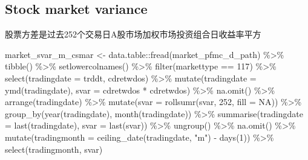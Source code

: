 \documentclass[
]{article}
\newenvironment{Shaded}{\begin{snugshade}}{\end{snugshade}}
\newcommand{\AttributeTok}[1]{\textcolor[rgb]{0.77,0.63,0.00}{#1}}
\newcommand{\ConstantTok}[1]{\textcolor[rgb]{0.00,0.00,0.00}{#1}}
\newcommand{\DecValTok}[1]{\textcolor[rgb]{0.00,0.00,0.81}{#1}}
\newcommand{\FunctionTok}[1]{\textcolor[rgb]{0.00,0.00,0.00}{#1}}
\newcommand{\NormalTok}[1]{#1}
\newcommand{\OtherTok}[1]{\textcolor[rgb]{0.56,0.35,0.01}{#1}}
\newcommand{\SpecialCharTok}[1]{\textcolor[rgb]{0.00,0.00,0.00}{#1}}
\newcommand{\StringTok}[1]{\textcolor[rgb]{0.31,0.60,0.02}{#1}}
\begin{document}
\hypertarget{stock-market-variance}{%
\subsection{Stock market variance}\label{stock-market-variance}}

股票方差是过去252个交易日A股市场加权市场投资组合日收益率平方

\begin{Shaded}
\begin{Highlighting}[]
\NormalTok{market\_svar\_m\_csmar }\OtherTok{\textless{}{-}}\NormalTok{ data.table}\SpecialCharTok{::}\FunctionTok{fread}\NormalTok{(market\_pfmc\_d\_path) }\SpecialCharTok{\%\textgreater{}\%} 
  \FunctionTok{tibble}\NormalTok{() }\SpecialCharTok{\%\textgreater{}\%} 
  \FunctionTok{setlowercolnames}\NormalTok{() }\SpecialCharTok{\%\textgreater{}\%} 
  \FunctionTok{filter}\NormalTok{(markettype }\SpecialCharTok{==} \DecValTok{117}\NormalTok{) }\SpecialCharTok{\%\textgreater{}\%} 
  \FunctionTok{select}\NormalTok{(}\AttributeTok{tradingdate =}\NormalTok{ trddt, cdretwdos) }\SpecialCharTok{\%\textgreater{}\%} 
  \FunctionTok{mutate}\NormalTok{(}\AttributeTok{tradingdate =} \FunctionTok{ymd}\NormalTok{(tradingdate), }\AttributeTok{svar =}\NormalTok{ cdretwdos }\SpecialCharTok{*}\NormalTok{ cdretwdos) }\SpecialCharTok{\%\textgreater{}\%} 
  \FunctionTok{na.omit}\NormalTok{() }\SpecialCharTok{\%\textgreater{}\%} 
  \FunctionTok{arrange}\NormalTok{(tradingdate) }\SpecialCharTok{\%\textgreater{}\%} 
  \FunctionTok{mutate}\NormalTok{(}\AttributeTok{svar =} \FunctionTok{rollsumr}\NormalTok{(svar, }\DecValTok{252}\NormalTok{, }\AttributeTok{fill =} \ConstantTok{NA}\NormalTok{)) }\SpecialCharTok{\%\textgreater{}\%} 
  \FunctionTok{group\_by}\NormalTok{(}\FunctionTok{year}\NormalTok{(tradingdate), }\FunctionTok{month}\NormalTok{(tradingdate)) }\SpecialCharTok{\%\textgreater{}\%} 
  \FunctionTok{summarise}\NormalTok{(}\AttributeTok{tradingdate =} \FunctionTok{last}\NormalTok{(tradingdate), }\AttributeTok{svar =} \FunctionTok{last}\NormalTok{(svar)) }\SpecialCharTok{\%\textgreater{}\%} 
  \FunctionTok{ungroup}\NormalTok{() }\SpecialCharTok{\%\textgreater{}\%} 
  \FunctionTok{na.omit}\NormalTok{() }\SpecialCharTok{\%\textgreater{}\%} 
  \FunctionTok{mutate}\NormalTok{(}\AttributeTok{tradingmonth =} \FunctionTok{ceiling\_date}\NormalTok{(tradingdate, }\StringTok{"m"}\NormalTok{) }\SpecialCharTok{{-}} \FunctionTok{days}\NormalTok{(}\DecValTok{1}\NormalTok{)) }\SpecialCharTok{\%\textgreater{}\%} 
  \FunctionTok{select}\NormalTok{(tradingmonth, svar)}
\end{Highlighting}
\end{Shaded}
\end{document}
